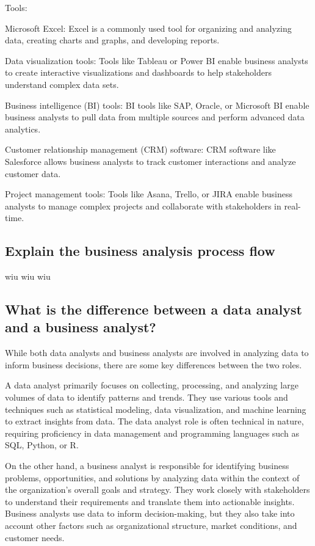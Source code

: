 \documentclass[12pt, a4paper, oneside]{article}
\begin{document}
Tools:

Microsoft Excel: Excel is a commonly used tool for organizing and analyzing data, creating charts and graphs, and developing reports.

Data visualization tools: Tools like Tableau or Power BI enable business analysts to create interactive visualizations and dashboards to help stakeholders understand complex data sets.

Business intelligence (BI) tools: BI tools like SAP, Oracle, or Microsoft BI enable business analysts to pull data from multiple sources and perform advanced data analytics.

Customer relationship management (CRM) software: CRM software like Salesforce allows business analysts to track customer interactions and analyze customer data.

Project management tools: Tools like Asana, Trello, or JIRA enable business analysts to manage complex projects and collaborate with stakeholders in real-time.
\subsection{ Explain the business analysis process flow }
wiu wiu wiu 
\subsection{ What is the difference between a data analyst and a business analyst? }
While both data analysts and business analysts are involved in analyzing data to inform business decisions, there are some key differences between the two roles.

A data analyst primarily focuses on collecting, processing, and analyzing large volumes of data to identify patterns and trends. They use various tools and techniques such as statistical modeling, data visualization, and machine learning to extract insights from data. The data analyst role is often technical in nature, requiring proficiency in data management and programming languages such as SQL, Python, or R.

On the other hand, a business analyst is responsible for identifying business problems, opportunities, and solutions by analyzing data within the context of the organization's overall goals and strategy. They work closely with stakeholders to understand their requirements and translate them into actionable insights. Business analysts use data to inform decision-making, but they also take into account other factors such as organizational structure, market conditions, and customer needs.
\end{document}
